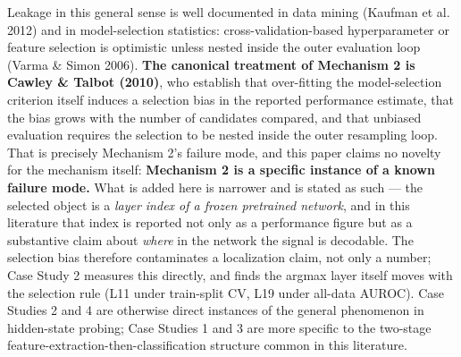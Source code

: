 \documentclass[10pt]{article} %
\begin{document}
Leakage in this general sense is well documented in data mining (Kaufman et
al. 2012) and in model-selection statistics: cross-validation-based
hyperparameter or feature selection is optimistic unless nested inside the
outer evaluation loop (Varma \& Simon 2006). \textbf{The canonical treatment of
Mechanism 2 is Cawley \& Talbot (2010)}, who establish that over-fitting the
model-selection criterion itself induces a selection bias in the reported
performance estimate, that the bias grows with the number of candidates
compared, and that unbiased evaluation requires the selection to be nested
inside the outer resampling loop. That is precisely Mechanism 2's failure mode,
and this paper claims no novelty for the mechanism itself: \textbf{Mechanism 2
is a specific instance of a known failure mode.} What is added here is narrower
and is stated as such --- the selected object is a \emph{layer index of a frozen
pretrained network}, and in this literature that index is reported not only as a
performance figure but as a substantive claim about \emph{where} in the network
the signal is decodable. The selection bias therefore contaminates a
localization claim, not only a number; Case Study 2 measures this directly, and
finds the argmax layer itself moves with the selection rule (L11 under
train-split CV, L19 under all-data AUROC). Case Studies 2 and 4 are otherwise
direct instances of the general phenomenon in hidden-state probing; Case Studies
1 and 3 are more specific to the two-stage
feature-extraction-then-classification structure common in this literature.
\end{document}
